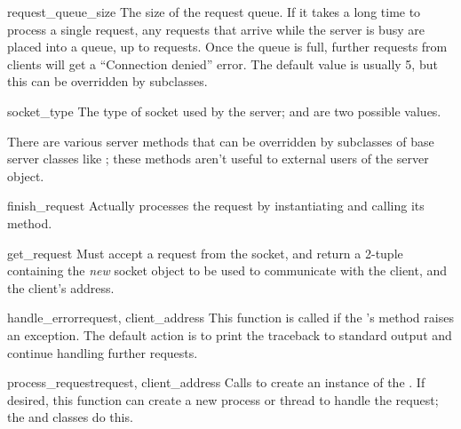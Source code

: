 \begin{datadesc}{request_queue_size}
The size of the request queue.  If it takes a long time to process a
single request, any requests that arrive while the server is busy are
placed into a queue, up to  requests.  Once
the queue is full, further requests from clients will get a
``Connection denied'' error.  The default value is usually 5, but this
can be overridden by subclasses.
\end{datadesc}

\begin{datadesc}{socket_type}
The type of socket used by the server; 
and  are two possible values.
\end{datadesc}

There are various server methods that can be overridden by subclasses
of base server classes like ; these methods aren't
useful to external users of the server object.


\begin{funcdesc}{finish_request}{}
Actually processes the request by instantiating
 and calling its  method.
\end{funcdesc}

\begin{funcdesc}{get_request}{}
Must accept a request from the socket, and return a 2-tuple containing
the \emph{new} socket object to be used to communicate with the
client, and the client's address.
\end{funcdesc}

\begin{funcdesc}{handle_error}{request, client_address}
This function is called if the 's
 method raises an exception.  The default action is
to print the traceback to standard output and continue handling
further requests.
\end{funcdesc}

\begin{funcdesc}{process_request}{request, client_address}
Calls  to create an instance of the
.  If desired, this function can create a
new process or thread to handle the request; the 
and  classes do this.
\end{funcdesc}

